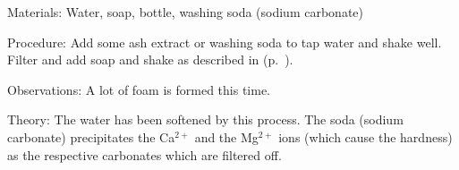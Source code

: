 \begin{multicols}{2}
\begin{description*}
\item[Materials:]{Water, soap, bottle, washing soda (sodium carbonate)}
\item[Procedure:]{Add some ash extract or washing soda to tap water and shake well. Filter and add soap and shake as described in  (p.~\pageref{sub:water-pure}).}
\item[Observations:]{A lot of foam is formed this time.}
\item[Theory:]{The water has been softened by this process.
The soda (sodium carbonate) precipitates
the Ca$^{2+}$ and the Mg$^{2+}$ ions (which cause the
hardness) as the respective carbonates which
are filtered off.}
\end{description*}




\end{multicols}

\pagebreak